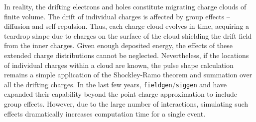 In reality, the drifting electrons and holes constitute migrating charge clouds of finite volume. The drift of individual charges is affected by group effects -- diffusion and self-repulsion. Thus, each charge cloud evolves in time, acquiring a teardrop shape due to charges on the surface of the cloud shielding the drift field from the inner charges. Given enough deposited energy, the effects of these extended charge distributions cannot be neglected. Nevertheless, if the locations of individual charges within a cloud are known, the pulse shape calculation remains a simple application of the Shockley-Ramo theorem and summation over all the drifting charges. In the last few years, \texttt{fieldgen}/\texttt{siggen} and \SSD{} have expanded their capability beyond the point charge approximation to include group effects. However, due to the large number of interactions, simulating such effects dramatically increases computation time for a single event.

